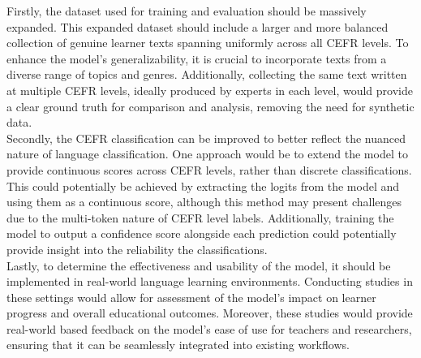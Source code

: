 Firstly, the dataset used for training and evaluation should be massively expanded. This expanded dataset should include a larger and more balanced collection of genuine learner texts spanning uniformly across all CEFR levels. To enhance the model's generalizability, it is crucial to incorporate texts from a diverse range of topics and genres. Additionally, collecting the same text written at multiple CEFR levels, ideally produced by experts in each level, would provide a clear ground truth for comparison and analysis, removing the need for synthetic data. \\
Secondly, the CEFR classification can be improved to better reflect the nuanced nature of language classification. One approach would be to extend the model to provide continuous scores across CEFR levels, rather than discrete classifications. This could potentially be achieved by extracting the logits from the model and using them as a continuous score, although this method may present challenges due to the multi-token nature of CEFR level labels. Additionally, training the model to output a confidence score alongside each prediction could potentially provide insight into the reliability the classifications. \\
Lastly, to determine the effectiveness and usability of the model, it should be implemented in real-world language learning environments. Conducting studies in these settings would allow for assessment of the model's impact on learner progress and overall educational outcomes. Moreover, these studies would provide real-world based feedback on the model's ease of use for teachers and researchers, ensuring that it can be seamlessly integrated into existing workflows.

    